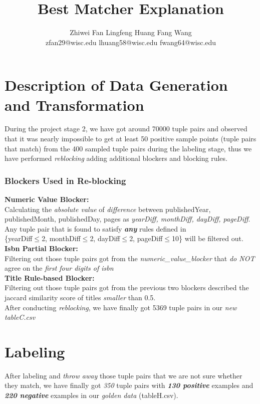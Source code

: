 \documentclass[10pt, oneside]{article}
\title{\textbf{Best Matcher Explanation}}
\author{Zhiwei Fan\hspace{7ex}
	   Lingfeng Huang\hspace{7ex}
	   Fang Wang\\
	   zfan29@wisc.edu\hspace{3ex}
	   lhuang58@wisc.edu\hspace{3ex}
	   fwang64@wisc.edu
	   }
\begin{document}
\maketitle 

\section*{Description of Data Generation and Transformation}
During the project stage 2, we have got around 70000 tuple pairs and observed that it was nearly impossible to get at least 50 positive
sample points (tuple pairs that match) from the 400 sampled tuple pairs during the labeling stage, thus we have performed \textit{reblocking}
adding additional blockers and blocking rules. 
\subsubsection*{Blockers Used in Re-blocking}
\textbf{Numeric Value Blocker:} \\
Calculating the \textit{absolute value} of \textit{difference} between {publishedYear, publishedMonth, publishedDay, pages} as \textit{yearDiff, monthDiff, dayDiff, pageDiff}. Any tuple pair
that is found to satisfy \textbf{\textit{any}} rules defined in \\ \{yearDiff$\leq$2, monthDiff$\leq$2, dayDiff$\leq$2, pageDiff$\leq$10\} will be filtered out.
\vspace{1ex}
\\
\textbf{Isbn Partial Blocker:}\\
Filtering out those tuple pairs got from the \textit{numeric\_value\_blocker} that \textit{do NOT} agree on the \textit{first four digits of isbn}
\vspace{1ex}
\\
\textbf{Title Rule-based Blocker:}\\
Filtering out those tuple pairs got from the previous two blockers described the jaccard similarity score of titles \textit{smaller} than 0.5.
\vspace{1ex}
\\
After conducting \textit{reblocking}, we have finally got 5369 tuple pairs in our \textit{new} \textit{tableC.csv}

\section*{Labeling}
After labeling and \textit{throw away}  those tuple pairs that we are not sure whether they match, we have finally got \textit{350} tuple pairs with 
\textit{\textbf{130 positive}} examples and \textit{\textbf{220 negative}} examples in our \textit{golden data} (tableH.csv). 
\end{document}
